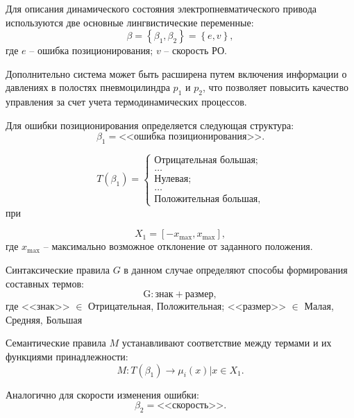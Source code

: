 Для описания динамического состояния электропневматического привода
используются две основные лингвистические переменные:
\begin{equation}
	\beta = \left\{\beta_1, \beta_2\right\} = \left\{e, v\right\},
\end{equation}
где $e$ -- ошибка позиционирования;
$v$ -- скорость РО.

Дополнительно система может быть расширена путем включения информации о
давлениях в полостях пневмоцилиндра $p_1$ и $p_2$, что позволяет повысить
качество управления за счет учета термодинамических процессов.

Для ошибки позиционирования определяется следующая структура:
\begin{equation}
	\beta_1 = \text{<<ошибка позиционирования>>}.
\end{equation}

\begin{equation}
	T(\beta_1) =\begin{cases}
		\text{Отрицательная большая}; \\
		\ldots                        \\
		\text{Нулевая}     ;          \\
		\ldots                        \\
		\text{Положительная большая},
	\end{cases}
\end{equation}
при

\begin{equation}
	X_1 = [-x_{\text{max}}, x_{\text{max}}],
\end{equation}
где $x_{\text{max}}$ -- максимально возможное отклонение от заданного положения.

Синтаксические правила $G$ в данном случае определяют способы формирования составных термов:
\begin{equation}
	\text{G}: \text{знак} + \text{размер},
\end{equation}
где <<знак>> $\in$ {Отрицательная, Положительная}; <<размер>> $\in$ {Малая, Средняя, Большая}

Семантические правила $M$ устанавливают соответствие между термами и их функциями принадлежности:
\begin{equation}
	M: T(\beta_1) \rightarrow {\mu_i(x) | x \in X_1}.
\end{equation}

Аналогично для скорости изменения ошибки:
\begin{equation}
	\beta_2 = \text{<<скорость>>}.
\end{equation}

